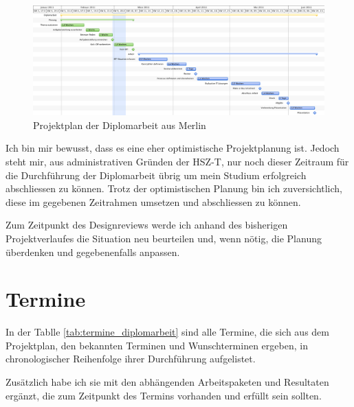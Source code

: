 \begin{figure}[htbp]
\begin{center}
\includegraphics[width=1\textwidth,angle=0]{./bilder/anhang/projektplanung.pdf}
\caption{Projektplan der Diplomarbeit aus Merlin}
\label{pic:projektplan}
\end{center}
\end{figure}

Ich bin mir bewusst, dass es eine eher optimistische Projektplanung ist. Jedoch
steht mir, aus administrativen Gründen der HSZ-T, nur noch dieser Zeitraum für
die Durchführung der Diplomarbeit übrig um mein Studium erfolgreich abschliessen
zu können. Trotz der optimistischen Planung bin ich zuversichtlich, diese
im gegebenen Zeitrahmen umsetzen und abschliessen zu können.

Zum Zeitpunkt des Designreviews werde ich anhand des bisherigen Projektverlaufes
die Situation neu beurteilen und, wenn nötig, die Planung überdenken und 
gegebenenfalls anpassen.

\section{Termine}
In der Tablle \ref{tab:termine_diplomarbeit} sind alle Termine, die sich aus 
dem Projektplan, den bekannten Terminen und Wunschterminen ergeben, in chronologischer
Reihenfolge ihrer Durchführung aufgelistet.

Zusätzlich habe ich sie mit den abhängenden Arbeitspaketen
und Resultaten ergänzt, die zum Zeitpunkt des Termins vorhanden und erfüllt
sein sollten.

